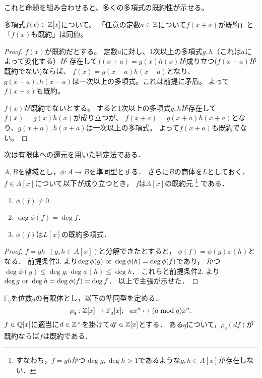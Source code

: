 \documentclass[a4j]{jsarticle}
\begin{document}
これと命題を組み合わせると、多くの多項式の既約性が示せる。
\begin{Prop}
    多項式$f(x) \in \mathbb{Z}[x]$について、
    「任意の定数$a \in \mathbb{Z}$について$f(x+a)$が既約」と「$f(x)$も既約」は同値。
\end{Prop}
\begin{proof}
    $f(x)$が既約だとする。
    定数$a$に対し、1次以上の多項式$g,h$（これは$a$によって変化する）が
    存在して$f(x+a)=g(x)h(x)$が成り立つ($f(x+a)$が既約でない)ならば、
    $f(x)=g(x-a)h(x-a)$となり、$g(x-a), h(x-a)$は一次以上の多項式。これは前提に矛盾。
    よって$f(x+a)$も既約。

    $f(x)$が既約でないとする。
    すると1次以上の多項式$g,h$が存在して$f(x)=g(x)h(x)$が成り立つが、
    $f(x+a)=g(x+a) h(x+a)$となり、$g(x+a), h(x+a)$は一次以上の多項式。
    よって$f(x+a)$も既約でない。
\end{proof}

次は有限体への還元を用いた判定法である．
\begin{Them}
    $A,B$を整域とし，$\phi: A \to B$を準同型とする．
    さらに$B$の商体を$L$としておく．
    $f \in A[x]$について以下が成り立つとき，
    $f$は$A[x]$の既約元
    \footnote{すなわち，$f=gh$かつ$\deg g, \deg h >1$であるような$g,h \in A[x]$が存在しない．}
    である．
    \begin{enumerate}
        \item $\phi(f) \neq 0$.
        \item $\deg \phi(f)=\deg f$．
        \item $\phi(f)$は$L[x]$の既約多項式．
    \end{enumerate}
\end{Them}
\begin{proof}
    $f=gh ~~(g,h \in A[x])$と分解できたとすると，
    $\phi(f)=\phi(g) \phi(h)$となる．
    前提条件3. より$\deg \phi(g) \text{ or } \deg \phi(h)=\deg \phi(f)$であり，
    かつ$\deg \phi(g) \leq \deg g, \deg \phi(h) \leq \deg h$．
    これらと前提条件2. より$\deg g \text{ or } \deg h=\deg \phi(f)=\deg f$．
    以上で主張が示せた．
\end{proof}

\begin{Cor}
    $\mathbb{F}_q$を位数$q$の有限体とし，以下の準同型を定める．
    \[ \rho_q: \mathbb{Z}[x] \to \mathbb{F}_q[x];~~ ax^n \mapsto (a \bmod q)x^n. \]
    $f \in \mathbb{Q}[x]$に適当に$d \in \mathbb{Z}^{\times}$を掛けて$df \in \mathbb{Z}[x]$とする．
    ある$q$について，$\rho_q(df)$が既約ならば$f$は既約である．
\end{Cor}
\end{document}
